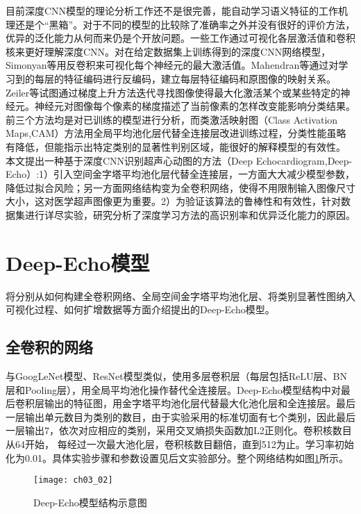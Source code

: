 目前深度CNN模型的理论分析工作还不是很完善，能自动学习语义特征的工作机理还是个“黑箱”。对于不同的模型的比较除了准确率之外并没有很好的评价方法，优异的泛化能力从何而来仍是个开放问题。一些工作\citep{simonyan14deep,Mahendran2015,Zeiler2014,Zhou2015}通过可视化各层激活值和卷积核来更好理解深度CNN。对在给定数据集上训练得到的深度CNN网络模型，Simonyan等\citep{simonyan14deep}用反卷积来可视化每个神经元的最大激活值。Mahendran等\citep{Mahendran2015}通过对学习到的每层的特征编码进行反编码，建立每层特征编码和原图像的映射关系。Zeiler等\citep{Zeiler2014}试图通过梯度上升方法迭代寻找图像使得最大化激活某个或某些特定的神经元。神经元对图像每个像素的梯度描述了当前像素的怎样改变能影响分类结果。前三个方法均是对已训练的模型进行分析，而类激活映射图（Class Activation Maps,CAM）方法\citep{Zhou2015}用全局平均池化层代替全连接层改进训练过程，分类性能虽略有降低，但能指示出特定类别的显著性判别区域，能很好的解释模型的有效性。
本文提出一种基于深度CNN识别超声心动图的方法（Deep Echocardiogram,Deep-Echo）:1）引入空间金字塔平均池化层代替全连接层，一方面大大减少模型参数，降低过拟合风险；另一方面网络结构变为全卷积网络，使得不用限制输入图像尺寸大小，这对医学超声图像更为重要。2）为验证该算法的鲁棒性和有效性，针对数据集进行详尽实验，研究分析了深度学习方法的高识别率和优异泛化能力的原因。
 
\section{Deep-Echo模型}

将分别从如何构建全卷积网络、全局空间金字塔平均池化层、将类别显著性图纳入可视化过程、如何扩增数据等方面介绍提出的Deep-Echo模型。
\subsection{全卷积的网络}

与GoogLeNet模型\citep{Szegedy2015}、ResNet模型\citep{he15}类似，使用多层卷积层（每层包括ReLU层、BN层和Pooling层），用全局平均池化操作替代全连接层。Deep-Echo模型结构中对最后卷积层输出的特征图，用金字塔平均池化层\citep{He2015spp}代替最大化池化层和全连接层。最后一层输出单元数目为类别的数目，由于实验采用的标准切面有七个类别，因此最后一层输出7，依次对应相应的类别，采用交叉熵损失函数加L2正则化。卷积核数目从64开始， 每经过一次最大池化层，卷积核数目翻倍，直到512为止。学习率初始化为0.01。具体实验步骤和参数设置见后文实验部分。整个网络结构如图\ref{fig:ch03_02}所示。
 \begin{figure}[!htbp]
\centering
\texttt{[image: ch03\_02]}
\caption{Deep-Echo模型结构示意图}
\label{fig:ch03_02}
\end{figure}

